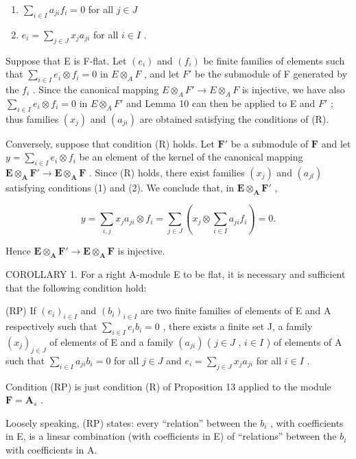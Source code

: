 \begin{enumerate}
\def\labelenumi{(\arabic{enumi})}
\item
  \(\sum_{i\in I}a_{ji}f_i = 0\) for all \(j\in J\)
\item
  \(e_i = \sum_{j \in J} x_j a_{ji}\) for all \(i \in I\) .
\end{enumerate}

Suppose that E is F-flat. Let \((e_{i})\) and \((f_{i})\) be finite families of elements such that \(\sum_{i\in I}e_{i}\otimes f_{i}=0\) in \(E\otimes_{A}F\) , and let \(F'\) be the submodule of F generated by the \(f_{i}\) . Since the canonical mapping \(E\otimes_{A}F'\to E\otimes_{A}F\) is injective, we have also \(\sum_{i\in I}e_{i}\otimes f_{i}=0\) in \(E\otimes_{A}F'\) and Lemma 10 can then be applied to E and \(F'\) ; thus families \((x_{j})\) and \((a_{ji})\) are obtained satisfying the conditions of (R).

Conversely, suppose that condition (R) holds. Let \(\mathbf{F}'\) be a submodule of \(\mathbf{F}\) and let \(y = \sum_{i\in I}e_i\otimes f_i\) be an element of the kernel of the canonical mapping \(\mathbf{E}\otimes_{\mathbf{A}}\mathbf{F}'\to \mathbf{E}\otimes_{\mathbf{A}}\mathbf{F}\) . Since (R) holds, there exist families \((x_j)\) and \((a_{jl})\) satisfying conditions (1) and (2). We conclude that, in \(\mathbf{E}\otimes_{\mathbf{A}}\mathbf{F}'\) ,

\[
y = \sum_ {i, j} x _ {j} a _ {j i} \otimes f _ {i} = \sum_ {j \in J} (x _ {j} \otimes \sum_ {i \in I} a _ {j i} f _ {i}) = 0.
\]

Hence \(\mathbf{E} \otimes_{\mathbf{A}} \mathbf{F}' \to \mathbf{E} \otimes_{\mathbf{A}} \mathbf{F}\) is injective.

COROLLARY 1. For a right A-module E to be flat, it is necessary and sufficient that the following condition hold:

(RP) If \((e_i)_{i\in I}\) and \((b_i)_{i\in I}\) are two finite families of elements of E and A respectively such that \(\sum_{i\in I}e_i b_i = 0\) , there exists a finite set J, a family \((x_j)_{j\in J}\) of elements of E and a family \((a_{ji})\) ( \(j\in J\) , \(i\in I\) ) of elements of A such that \(\sum_{i\in I}a_{ji}b_i = 0\) for all \(j\in J\) and \(e_i = \sum_{j\in J}x_j a_{ji}\) for all \(i\in I\) .

Condition (RP) is just condition (R) of Proposition 13 applied to the module \(\mathbf{F} = \mathbf{A}_s\) .

Loosely speaking, (RP) states: every ``relation'' between the \(b_{i}\) , with coefficients in E, is a linear combination (with coefficients in E) of ``relations'' between the \(b_{i}\) with coefficients in A.

